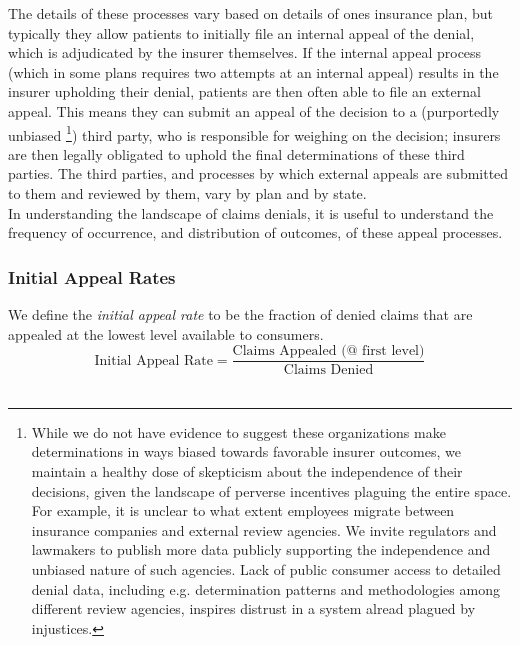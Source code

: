 \documentclass[psamsfonts]{amsart}
\theoremstyle{plain}
\theoremstyle{definition}
\theoremstyle{remark}
\begin{document}
The details of these processes vary based on details of ones insurance plan, but typically they allow patients to initially file an internal appeal of the denial, which is adjudicated by the insurer themselves. If the internal appeal process (which in some plans requires two attempts at an internal appeal) results in the insurer upholding their denial, patients are then often able to file an external appeal. This means they can submit an appeal of the decision to a (purportedly unbiased \footnote{While we do not have evidence to suggest these organizations make determinations in ways biased towards favorable insurer outcomes, we maintain a healthy dose of skepticism about the independence of their decisions, given the landscape of perverse incentives plaguing the entire space. For example, it is unclear to what extent employees migrate between insurance companies and external review agencies. We invite regulators and lawmakers to publish more data publicly supporting the independence and unbiased nature of such agencies. Lack of public consumer access to detailed denial data, including e.g. determination patterns and methodologies among different review agencies, inspires distrust in a system alread plagued by injustices.}) third party, who is responsible for weighing on the decision; insurers are then legally obligated to uphold the final determinations of these third parties. The third parties, and processes by which external appeals are submitted to them and reviewed by them, vary by plan and by state.\\

In understanding the landscape of claims denials, it is useful to understand the frequency of occurrence, and distribution of outcomes, of these appeal processes.\\

\subsubsection{Initial Appeal Rates}

We define the \emph{initial appeal rate} to be the fraction of denied claims that are appealed at the lowest level available to consumers.\\

\begin{equation*}
	\text{Initial Appeal Rate} = \dfrac{\text{Claims Appealed (@ first level)}}{\text{Claims Denied}}
\end{equation*}
\hfill\\
\end{document}
